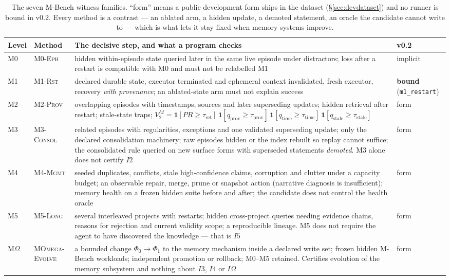\documentclass[11pt]{article}
\theoremstyle{definition}
\begin{document}
\begin{table}[!htbp]
\centering\scriptsize
\begin{tabularx}{\textwidth}{@{}llYl@{}}
\toprule
Level & Method & The decisive step, and what a program checks & v0.2 \\
\midrule
M0 & \textsc{M0-Eph} & hidden within-episode state queried later in the same live episode under distractors; loss after a restart is compatible with M0 and must not be relabelled M1 & implicit \\
M1 & \textsc{M1-Rst} & declared durable state, executor terminated and ephemeral context invalidated, fresh executor, recovery \emph{with provenance}; an ablated-state arm must not explain success & \textbf{bound} (\texttt{m1\_restart}) \\
M2 & \textsc{M2-Prov} & overlapping episodes with timestamps, sources and later superseding updates; hidden retrieval after restart; stale-state traps; $V^{M}_2 = \mathbf 1[PR \ge \tau_{\mathrm{ret}}]\,\mathbf 1[q_{\mathrm{prov}} \ge \tau_{\mathrm{prov}}]\,\mathbf 1[q_{\mathrm{time}} \ge \tau_{\mathrm{time}}]\,\mathbf 1[q_{\mathrm{stale}} \ge \tau_{\mathrm{stale}}]$ & form \\
M3 & \textsc{M3-Consol} & related episodes with regularities, exceptions and one validated superseding update; only the declared consolidation machinery; raw episodes hidden or the index rebuilt so replay cannot suffice; the consolidated rule queried on new surface forms with superseded statements \emph{demoted}. M3 alone does not certify $I2$ & form \\
M4 & \textsc{M4-Mgmt} & seeded duplicates, conflicts, stale high-confidence claims, corruption and clutter under a capacity budget; an observable repair, merge, prune or snapshot action (narrative diagnosis is insufficient); memory health on a frozen hidden suite before and after; the candidate does not control the health oracle & form \\
M5 & \textsc{M5-Long} & several interleaved projects with restarts; hidden cross-project queries needing evidence chains, reasons for rejection and current validity scope; a reproducible lineage. M5 does not require the agent to have discovered the knowledge --- that is $I5$ & form \\
M$\Omega$ & \textsc{MOmega-Evolve} & a bounded change $\Phi_0 \to \Phi_1$ to the memory mechanism inside a declared write set; frozen hidden M-Bench workloads; independent promotion or rollback; M0--M5 retained. Certifies evolution of the memory subsystem and nothing about $I3$, $I4$ or $I\Omega$ & form \\
\bottomrule
\end{tabularx}
\caption{The seven M-Bench witness families. ``form'' means a public development form ships in the dataset (\S\ref{sec:devdataset}) and no runner is bound in v0.2. Every method is a contrast --- an ablated arm, a hidden update, a demoted statement, an oracle the candidate cannot write to --- which is what lets it stay fixed when memory systems improve.}
\label{tab:mbench}
\end{table}
\end{document}
